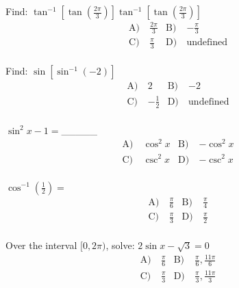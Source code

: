\begin{problem}\label{PreCal-16}
Find: $\tan ^{-1}\left[\tan \left(\frac{2 \pi}{3}\right)\right] \tan ^{-1}\left[\tan \left(\frac{2 \pi}{3}\right)\right]$
\begin{align*}
\text{A)}\ & \frac{2 \pi}{3} &
\text{B)}\ & -\frac{\pi}{3} \\
\text{C)}\ & \frac{\pi}{3}  &
\text{D)}\ & \text{undefined}\\
\end{align*}    
\end{problem}


\begin{problem}\label{PreCal-17}
Find: $\sin \left[\sin ^{-1}(-2)\right]$
\begin{align*}
\text{A)}\ & 2 &
\text{B)}\ & -2 \\
\text{C)}\ & -\frac{1}{2}  &
\text{D)}\ & \text{undefined}\\
\end{align*}    
\end{problem}



\begin{problem}\label{PreCal-18}
$\sin ^{2} x-1=$\_\_\_\_\_
\begin{align*}
\text{A)}\ & \cos ^{2} x &
\text{B)}\ &  -\cos ^{2} x\\
\text{C)}\ & \csc ^{2} x  &
\text{D)}\ & -\csc ^{2} x \\
\end{align*}    
\end{problem}


\begin{problem}\label{PreCal-19}
$\cos ^{-1}\left(\frac{1}{2}\right)=$
\begin{align*}
\text{A)}\ & \frac{\pi}{6} &
\text{B)}\ & \frac{\pi}{4} \\
\text{C)}\ &  \frac{\pi}{3} &
\text{D)}\ & \frac{\pi}{2}\\
\end{align*}    
\end{problem}


\begin{problem}\label{PreCal-20}
Over the interval $[0,2 \pi)$, solve: $2 \sin x-\sqrt{3}=0$
\begin{align*}
\text{A)}\ & \frac{\pi}{6} &
\text{B)}\ &  \frac{\pi}{6}, \frac{11 \pi}{6}\\
\text{C)}\ &  \frac{\pi}{3} &
\text{D)}\ & \frac{\pi}{3}, \frac{11 \pi}{3}\\
\end{align*}    
\end{problem}



